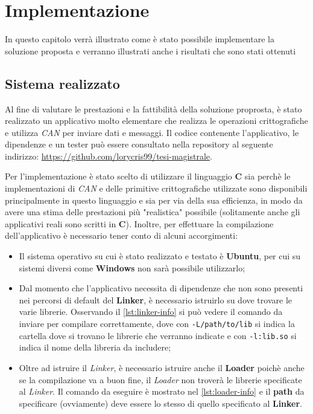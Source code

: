 \chapter{Implementazione} %
%

\begin{citazione}
In questo capitolo verrà illustrato come è stato possibile implementare la soluzione proposta e verranno illustrati anche i risultati che sono stati ottenuti
\end{citazione}

\section{Sistema realizzato}
Al fine di valutare le prestazioni e la fattibilità della soluzione proprosta, è stato realizzato un applicativo molto elementare che realizza le operazioni crittografiche e utilizza \emph{CAN} per inviare dati e messaggi. Il codice contenente l'applicativo, le dipendenze e un tester può essere consultato nella repository al seguente indirizzo: \url{https://github.com/lorycris99/tesi-magistrale}.

Per l'implementazione è stato scelto di utilizzare il linguaggio \textbf{C} sia perchè le implementazioni di \emph{CAN} e delle primitive crittografiche utilizzate sono disponibili principalmente in questo linguaggio e sia per via della sua efficienza, in modo da avere una stima delle prestazioni più "realistica" possibile (solitamente anche gli applicativi reali sono scritti in \textbf{C}). Inoltre, per effettuare la compilazione dell'applicativo è necessario tener conto di alcuni accorgimenti:
\begin{itemize}
    \item Il sistema operativo su cui è stato realizzato e testato è \textbf{Ubuntu}, per cui su sistemi diversi come \textbf{Windows} non sarà possibile utilizzarlo;
    \item Dal momento che l'applicativo necessita di dipendenze che non sono presenti nei percorsi di default del \textbf{Linker}, è necessario istruirlo su dove trovare le varie librerie. Osservando il \autoref{lst:linker-info} si può vedere il comando da inviare per compilare correttamente, dove con \texttt{-L/path/to/lib} si indica la cartella dove si trovano le librerie che verranno indicate e con \texttt{-l:lib.so} si indica il nome della libreria da includere;
    \item Oltre ad istruire il \emph{Linker}, è necessario istruire anche il \textbf{Loader} poichè anche se la compilazione va a buon fine, il \emph{Loader} non troverà le librerie specificate al \emph{Linker}. Il comando da eseguire è mostrato nel \autoref{lst:loader-info} e il \textbf{path} da specificare (ovviamente) deve essere lo stesso di quello specificato al \textbf{Linker}.
\end{itemize}


